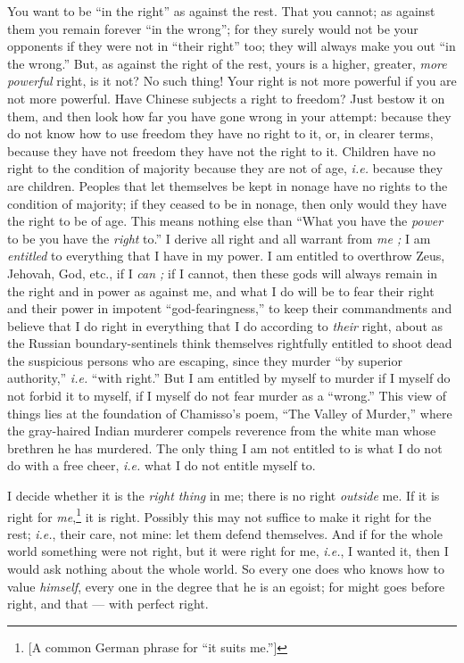 You want to be ``in the right'' as against the rest. That you cannot; as 
against them you remain forever ``in the wrong''; for they surely would not 
be your opponents if they were not in ``their right'' too; they will always 
make you out ``in the wrong.'' But, as against the right of the rest, yours 
is a higher, greater, \textit{more powerful} right, is it not? No such thing! 
Your right is not more powerful if you are not more powerful. Have Chinese 
subjects a right to freedom? Just bestow it on them, and then look how far you 
have gone wrong in your attempt: because they do not know how to use freedom 
they have no right to it, or, in clearer terms, because they have not freedom 
they have not the right to it. Children have no right to the condition of 
majority because they are not of age, \textit{i.e.} because they are children. 
Peoples that let themselves be kept in nonage have no rights to the condition 
of majority; if they ceased to be in nonage, then only would they have the 
right to be of age. This means nothing else than ``What you have the 
\textit{power} to be you have the \textit{right} to.'' I derive all right and 
all warrant from \textit{me ;} I am \textit{entitled} to everything that I 
have in my power. I am entitled to overthrow Zeus, Jehovah, God, etc., if I 
\textit{can ;} if I cannot, then these gods will always remain in the right 
and in power as against me, and what I do will be to fear their right and 
their power in impotent ``god-fearingness,'' to keep their commandments and 
believe that I do right in everything that I do according to \textit{their} 
right, about as the Russian boundary-sentinels think themselves rightfully 
entitled to shoot dead the suspicious persons who are escaping, since they 
murder ``by superior authority,'' \textit{i.e.} ``with right.'' But I am 
entitled by myself to murder if I myself do not forbid it to myself, if I 
myself do not fear murder as a ``wrong.'' This view of things lies at the 
foundation of Chamisso's poem, ``The Valley of Murder,'' where the 
gray-haired Indian murderer compels reverence from the white man whose 
brethren he has murdered. The only thing I am not entitled to is what I do not 
do with a free cheer, \textit{i.e.} what I do not entitle myself to.

I decide whether it is the \textit{right thing} in me; there is no right 
\textit{outside} me. If it is right for \textit{me},\footnote{[A common German 
phrase for ``it suits me.'']} it is right. Possibly this may not suffice to 
make it right for the rest; \textit{i.e.}, their care, not mine: let them 
defend themselves. And if for the whole world something were not right, but it 
were right for me, \textit{i.e.}, I wanted it, then I would ask nothing about 
the whole world. So every one does who knows how to value \textit{himself}, 
every one in the degree that he is an egoist; for might goes before right, and 
that --- with perfect right.

